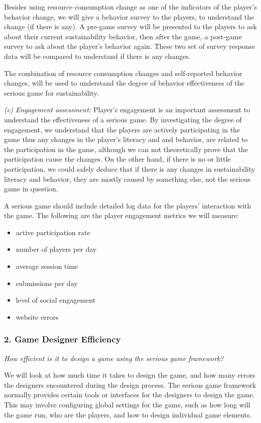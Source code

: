 \documentclass{sigchi}
\begin{document}
Besides using resource consumption change as one of the indicators of
the player's behavior change, we will give a behavior survey to the
players, to understand the change (if there is any). A pre-game survey
will be presented to the players to ask about their current
sustainability behavior, then after the game, a post-game survey to
ask about the player's behavior again. These two set of survey
response data will be compared to understand if there is any changes.

The combination of resource consumption changes and self-reported
behavior changes, will be used to understand the degree of behavior
effectiveness of the serious game for sustainability.

\emph {(c) Engagement assessment:} Player's engagement is an important
assessment to understand the effectiveness of a serious game. By
investigating the degree of engagement, we understand that the players
are actively participating in the game thus any changes in the
player's literacy and and behavior, are related to the participation
in the game, although we can not theoretically prove that the
participation cause the changes. On the other hand, if there is no or
little participation, we could safely deduce that if there is any
changes in sustainability literacy and behavior, they are mostly
caused by something else, not the serious game in question.

A serious game should include detailed log data for the players'
interaction with the game. The following are the player engagement
metrics we will measure:

\begin{itemize}
\item active participation rate
\item number of players per day
\item average session time
\item submissions per day
\item level of social engagement
\item website errors
\end{itemize}

\subsubsection{2. Game Designer Efficiency}

\emph{How efficient is it to design a game using the serious game
  framework?}

We will look at how much time it takes to design the game, and how
many errors the designers encountered during the design process.  The
serious game framework normally provides certain tools or interfaces
for the designers to design the game. This may involve configuring
global settings for the game, such as how long will the game run, who
are the players, and how to design individual game elements.
\end{document}
